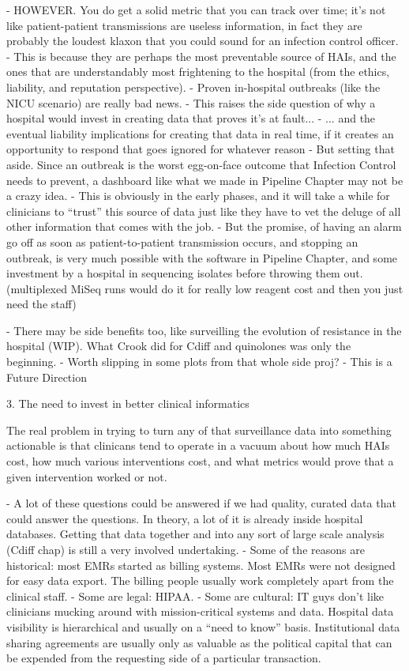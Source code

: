 - HOWEVER. You do get a solid metric that you can track over time; it's not like patient-patient transmissions are useless information, in fact they are probably the loudest klaxon that you could sound for an infection control officer.
  - This is because they are perhaps the most preventable source of HAIs, and the ones that are understandably most frightening to the hospital (from the ethics, liability, and reputation perspective).
  - Proven in-hospital outbreaks (like the NICU scenario) are really bad news.
    - This raises the side question of why a hospital would invest in creating data that proves it's at fault...
    - ... and the eventual liability implications for creating that data in real time, if it creates an opportunity to respond that goes ignored for whatever reason
  - But setting that aside. Since an outbreak is the worst egg-on-face outcome that Infection Control needs to prevent, a dashboard like what we made in Pipeline Chapter may not be a crazy idea.
  - This is obviously in the early phases, and it will take a while for clinicians to ``trust'' this source of data just like they have to vet the deluge of all other information that comes with the job.
  - But the promise, of having an alarm go off as soon as patient-to-patient transmission occurs, and stopping an outbreak, is very much possible with the software in Pipeline Chapter, and some investment by a hospital in sequencing isolates before throwing them out. (multiplexed MiSeq runs would do it for really low reagent cost and then you just need the staff)

- There may be side benefits too, like surveilling the evolution of resistance in the hospital (WIP). What Crook did for Cdiff and quinolones was only the beginning.
  - Worth slipping in some plots from that whole side proj?
  - This is a Future Direction

3. The need to invest in better clinical informatics

The real problem in trying to turn any of that surveillance data into something actionable is that clinicans tend to operate in a vacuum about how much HAIs cost, how much various interventions cost, and what metrics would prove that a given intervention worked or not.

- A lot of these questions could be answered if we had quality, curated data that could answer the questions. In theory, a lot of it is already inside hospital databases. Getting that data together and into any sort of large scale analysis (Cdiff chap) is still a very involved undertaking.
  - Some of the reasons are historical: most EMRs started as billing systems. Most EMRs were not designed for easy data export. The billing people usually work completely apart from the clinical staff.
  - Some are legal: HIPAA.
  - Some are cultural: IT guys don't like clinicians mucking around with mission-critical systems and data. Hospital data visibility is hierarchical and usually on a ``need to know'' basis. Institutional data sharing agreements are usually only as valuable as the political capital that can be expended from the requesting side of a particular transaction.

